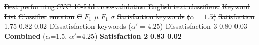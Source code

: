 \documentclass[smallextended,natbib]{svjour3}       %
\providecommand{\DIFdel}[1]{{\protect\color{red}\sout{#1}}}                      %
\providecommand{\DIFdelFL}[1]{\DIFdel{#1}} %
\begin{document}
{%
\DIFdelFL{Best performing SVC 10-fold cross-validation English text classifiers.}}
\DIFdelFL{Keyword List }%
\DIFdelFL{Classifier }%
\DIFdelFL{emotion}%
\DIFdelFL{C }%
\DIFdelFL{\(F_1\) }%
\DIFdelFL{\(\mu\)}%
\DIFdelFL{\(F_1\) }%
\DIFdelFL{\(\sigma\)}%
\DIFdelFL{Satisfaction keywords }%
\DIFdelFL{(\(\alpha=1.5\))}%
\DIFdelFL{Satisfaction}%
\DIFdelFL{1.75 }%
\DIFdelFL{0.82 }%
\DIFdelFL{0.02 }%
\DIFdelFL{Dissatisfaction keywords }%
\DIFdelFL{(\(\alpha'=4.25\))}%
\DIFdelFL{Dissatisfaction}%
\DIFdelFL{3 }%
\DIFdelFL{0.80 }%
\DIFdelFL{0.03 }%
\textbf{\DIFdelFL{Combined}} %
\DIFdelFL{(\(\alpha\)=1.5, \(\alpha'\)=4.25)}%
\textbf{%
\DIFdelFL{Satisfaction}%
} %
\textbf{\DIFdelFL{2}} %
\textbf{\DIFdelFL{0.83}} %
\textbf{\DIFdelFL{0.02}} %
\end{document}

